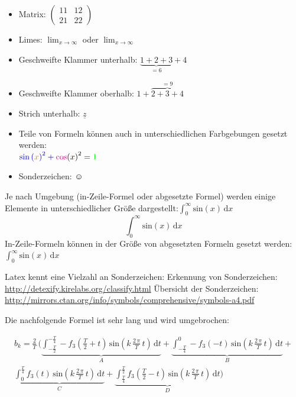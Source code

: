 \begin{itemize}
\item Matrix: $\left(\begin{matrix}11 & 12\\
21 & 22
\end{matrix}\right)$
\item Limes: $\lim_{x\rightarrow\infty}$ oder ${\displaystyle \lim_{x\rightarrow\infty}}$
\item Geschweifte Klammer unterhalb: $\underbrace{1+2+3}_{=6}+4$
\item Geschweifte Klammer oberhalb: $1+\overbrace{2+3+4}^{=9}$
\item Strich unterhalb: $\underline{z}$
\item Teile von Formeln können auch in unterschiedlichen Farbgebungen gesetzt
werden:\\
$\mathop{\color{blue}\sin}{\color{blue}\left({\color{brown}x}\right)^{2}+\mathop{\color{magenta}\cos}}\left(x\right)^{2}={\color{green}1}$
\item Sonderzeichen: $\smiley$
\end{itemize}
Je nach Umgebung (in-Zeile-Formel oder abgesetzte Formel) werden einige
Elemente in unterschiedlicher Größe dargestellt:$\int_{0}^{\infty}\mathrm{sin}(x)\,\mathrm{d}x$
\[
\int_{0}^{\infty}\mathrm{sin}(x)\,\mathrm{d}x
\]
In-Zeile-Formeln können in der Größe von abgesetzten Formeln gesetzt
werden: ${\displaystyle {\displaystyle \int_{0}^{\infty}\mathrm{sin}(x)\,\mathrm{d}x}}$

Latex kennt eine Vielzahl an Sonderzeichen: Erkennung von Sonderzeichen:
\url{http://detexify.kirelabs.org/classify.html} Übersicht der Sonderzeichen:
\url{http://mirrors.ctan.org/info/symbols/comprehensive/symbols-a4.pdf}

Die nachfolgende Formel ist sehr lang und wird umgebrochen:

\begin{multline*}
b_{k}=\frac{2}{T}\,\Biggl(\underbrace{\int_{-\frac{T}{2}}^{-\frac{T}{4}}-f_{3}\left(\frac{T}{2}+t\right)\,\mathrm{sin}\left(k\,\frac{2\,\pi}{T}\,t\right)\,\mathrm{d}t}_{A}+\underbrace{\int_{-\frac{T}{4}}^{0}-f_{3}\left(-t\right)\,\mathrm{sin}\left(k\,\frac{2\,\pi}{T}\,t\right)\,\mathrm{d}t}_{B}+\\
\underbrace{\int_{0}^{\frac{T}{4}}f_{3}\left(t\right)\,\mathrm{sin}\left(k\,\frac{2\,\pi}{T}\,t\right)\,\mathrm{d}t}_{C}+\underbrace{\int_{\frac{T}{4}}^{\frac{T}{2}}f_{3}\left(\frac{T}{2}-t\right)\,\mathrm{sin}\left(k\,\frac{2\,\pi}{T}\,t\right)\,\mathrm{d}t}_{D}\Biggr)
\end{multline*}

